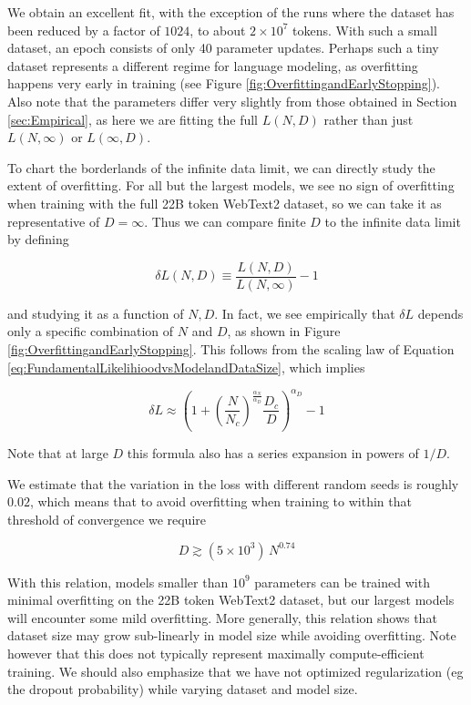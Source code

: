  We obtain an excellent fit, with the exception of the runs where the dataset has been reduced by a factor of $1024$, to about $2 \times 10^7$ tokens.  With such a small dataset, an epoch consists of only 40 parameter updates.  Perhaps such a tiny dataset represents a different regime for language modeling, as overfitting happens very early in training (see Figure \ref{fig:OverfittingandEarlyStopping}).  Also note that the parameters differ very slightly from those obtained in Section \ref{sec:Empirical}, as here we are fitting the full $L(N,D)$ rather than just $L(N, \infty)$ or $L(\infty, D)$.   

To chart the borderlands of the infinite data limit, we can directly study the extent of overfitting.  For all but the largest models, we see no sign of overfitting when training with the full 22B token WebText2 dataset, so we can take it as representative of $D=\infty$.  Thus we can compare finite $D$ to the infinite data limit by defining

\begin{equation}
\delta L(N, D) \equiv \frac{L(N, D)}{L(N, \infty)} - 1
\end{equation}

and studying it as a function of $N, D$.   In fact, we see empirically that $\delta L$ depends only a specific combination of $N$ and $D$, as shown in Figure \ref{fig:OverfittingandEarlyStopping}.  This follows from the scaling law of Equation \eqref{eq:FundamentalLikelihioodvsModelandDataSize}, which implies

\begin{equation}
\label{eq:OverfittingPrediction}
\delta L \approx  \left( 1 +  \left(\frac{N}{N_c} \right)^{\frac{\alpha_N}{\alpha_D}} \frac{D_c}{D} \right)^{\alpha_D} - 1 
\end{equation}

Note that at large $D$ this formula also has a series expansion in powers of $1/D$.

We estimate that the variation in the loss with different random seeds is roughly $0.02$, which means that to avoid overfitting when training to within that threshold of convergence we require

\begin{equation}
D \gtrsim (5 \times 10^3) \, N^{0.74}
\end{equation}

With this relation, models smaller than $10^9$ parameters can be trained with minimal overfitting on the 22B token WebText2 dataset, but our largest models will encounter some mild overfitting.  More generally, this relation shows that dataset size may grow sub-linearly in model size while avoiding overfitting.  Note however that this does not typically represent maximally compute-efficient training.  We should also emphasize that we have not optimized regularization (eg the dropout probability) while varying dataset and model size.

